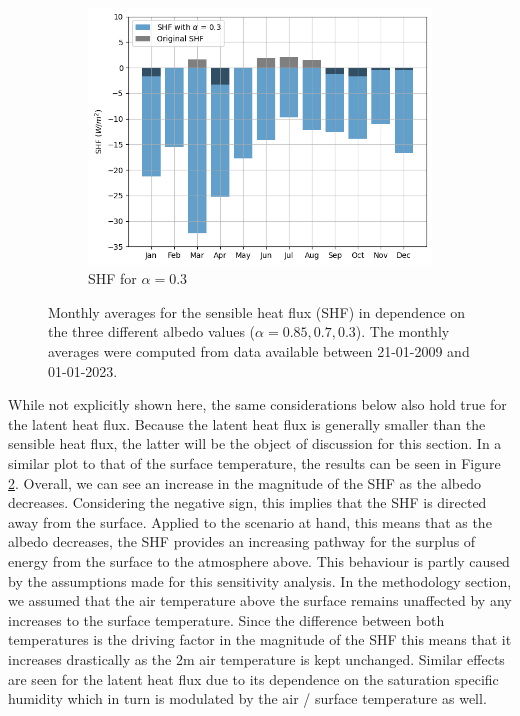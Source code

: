 \documentclass{article}
\begin{document}
\begin{figure}[h!]
  \vspace{1cm}  %
  \begin{subfigure}{0.5\textwidth}
      \centering
      \includegraphics[width=\linewidth]{figures/Bar_SHF_03.png}  %
      \caption{SHF for $\alpha = 0.3$}
      \label{fig:SHF03}
  \end{subfigure}
  
  \caption{Monthly averages for the sensible heat flux (SHF) in dependence on the three different albedo values ($\alpha = 0.85, 0.7, 0.3$). The monthly averages were computed from data available between 21-01-2009 and 01-01-2023.}
  \label{fig:SHF}
\end{figure}

While not explicitly shown here, the same considerations below also hold true for the latent heat flux. 
Because the latent heat flux is generally smaller than the sensible heat flux, the latter will be the object of discussion for this section. 
In a similar plot to that of the surface temperature, the results can be seen in Figure \ref{fig:SHF}. 
Overall, we can see an increase in the magnitude of the SHF as the albedo decreases. 
Considering the negative sign, this implies that the SHF is directed away from the surface. 
Applied to the scenario at hand, this means that as the albedo decreases, the SHF provides an increasing pathway for the surplus of energy from the surface to the atmosphere above. 
This behaviour is partly caused by the assumptions made for this sensitivity analysis. 
In the methodology section, we assumed that the air temperature above the surface remains unaffected by any increases to the surface temperature. 
Since the difference between both temperatures is the driving factor in the magnitude of the SHF this means that it increases drastically as the 2m air temperature is kept unchanged. 
Similar effects are seen for the latent heat flux due to its dependence on the saturation specific humidity which in turn is modulated by the air / surface temperature as well. 
\end{document}
